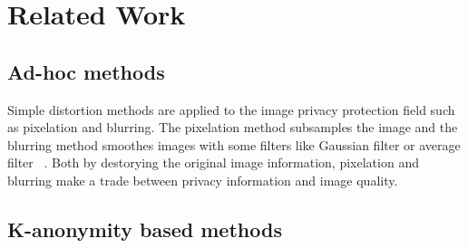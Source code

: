 \chapter{Related Work}

\section{Ad-hoc methods}
	Simple distortion methods are applied to the image privacy protection field such as pixelation and blurring. The pixelation method subsamples the image and the blurring method smoothes images with some filters like Gaussian filter or average filter ~\cite{Agrawal09,Boyle00}. Both by destorying the original image information, pixelation and blurring make a trade between privacy information and image quality. ~\cite{Winkler14}
\section{K-anonymity based methods}
